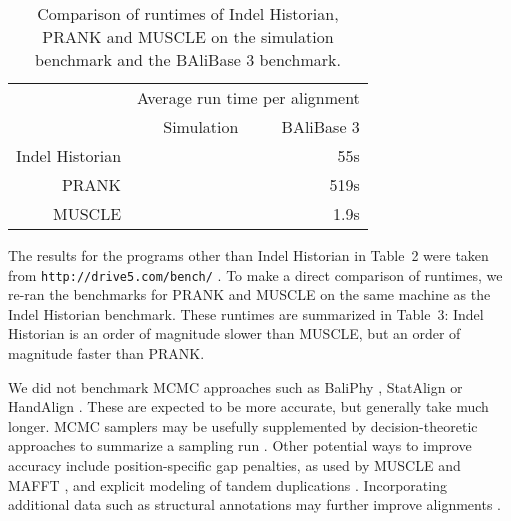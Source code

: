 \documentclass{bioinfo}
\begin{document}
\begin{table}
  \begin{tabular}{r|rr}
    & \multicolumn{2}{c}{Average run time per alignment} \\
 & Simulation & BAliBase 3 \\
    \hline
Indel Historian & & 55s \\
PRANK & & 519s \\
MUSCLE & & 1.9s \\
\end{tabular}
\caption{
    Comparison of runtimes of Indel Historian, PRANK and MUSCLE on the simulation benchmark and the BAliBase 3 benchmark.
  }
\end{table}

The results for the programs other than Indel Historian in Table~2 were taken from {\tt http://drive5.com/bench/} \citep{Edgar2010}.
To make a direct comparison of runtimes, we re-ran the benchmarks for PRANK and MUSCLE on the same machine as the Indel Historian benchmark.
These runtimes are summarized in Table~3: Indel Historian is an order of magnitude slower than MUSCLE, but an order of magnitude faster than PRANK.

We did not benchmark MCMC approaches
such as BaliPhy \citep{Redelings2014}, StatAlign \citep{NovakEtAl2008} or HandAlign \citep{WestessonBarquistHolmes2012}.
These are expected to be more accurate, but generally take much longer.
MCMC samplers may be usefully supplemented by decision-theoretic approaches to summarize a sampling run \citep{HermanEtAl2015}.
Other potential ways to improve accuracy include position-specific gap penalties, as used by MUSCLE \citep{Edgar2004b} and MAFFT \citep{KatohEtAl2005},
and explicit modeling of tandem duplications \citep{SzalkowskiAnisimova2013}.
Incorporating additional data such as structural annotations may further improve alignments \citep{HermanEtAl2014}.

% 
% 
% 
\end{document}
